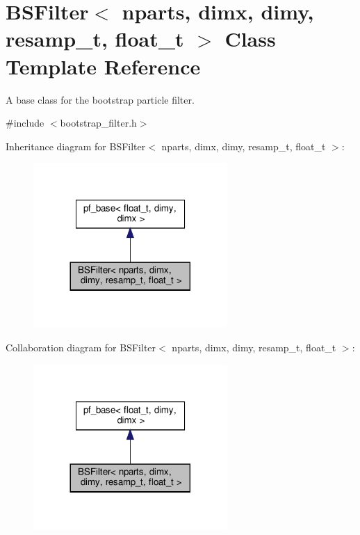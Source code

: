 \hypertarget{classBSFilter}{}\section{B\+S\+Filter$<$ nparts, dimx, dimy, resamp\+\_\+t, float\+\_\+t $>$ Class Template Reference}
\label{classBSFilter}


A base class for the bootstrap particle filter.  




{\ttfamily \#include $<$bootstrap\+\_\+filter.\+h$>$}



Inheritance diagram for B\+S\+Filter$<$ nparts, dimx, dimy, resamp\+\_\+t, float\+\_\+t $>$\+:
\nopagebreak
\begin{figure}[H]
\begin{center}
\leavevmode
\includegraphics[width=209pt]{classBSFilter__inherit__graph}
\end{center}
\end{figure}


Collaboration diagram for B\+S\+Filter$<$ nparts, dimx, dimy, resamp\+\_\+t, float\+\_\+t $>$\+:
\nopagebreak
\begin{figure}[H]
\begin{center}
\leavevmode
\includegraphics[width=209pt]{classBSFilter__coll__graph}
\end{center}
\end{figure}
